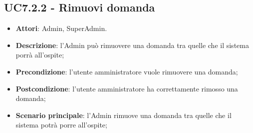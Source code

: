 \documentclass[../AnalisiDeiRequisiti_v3.0.0.tex]{subfiles}
\begin{document}
\subsection{UC7.2.2 - Rimuovi domanda} 
\label{sssec:UC7.2.2} 
\begin{itemize} 
\item \textbf{Attori}: Admin, SuperAdmin.
\item \textbf{Descrizione}: l'Admin può rimuovere una domanda tra quelle che il sistema porrà all'ospite;
\item \textbf{Precondizione}: l'utente amministratore vuole rimuovere una domanda;
\item \textbf{Postcondizione}: l'utente amministratore ha correttamente rimosso una domanda;
\item \textbf{Scenario principale}: l'Admin rimuove una domanda tra quelle che il sistema potrà porre all'ospite;
\end{itemize} 
\newpage
\end{document}
